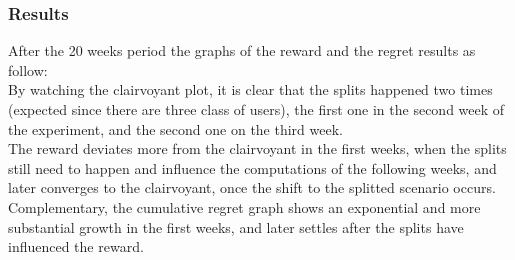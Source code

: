 \subsubsection{Results}
After the 20 weeks period the graphs of the reward and the regret results as follow:\\
By watching the clairvoyant plot, it is clear that the splits happened two times (expected since there are three class of users), the first one in the second week of the experiment, and the second one on the third week. \\The reward deviates more from the clairvoyant in the first weeks, when the splits still need to happen and influence the computations of the following weeks, and later converges to the clairvoyant, once the shift to the splitted scenario occurs. \\Complementary, the cumulative regret graph shows an exponential and more substantial growth in the first weeks, and later settles after the splits have influenced the reward.